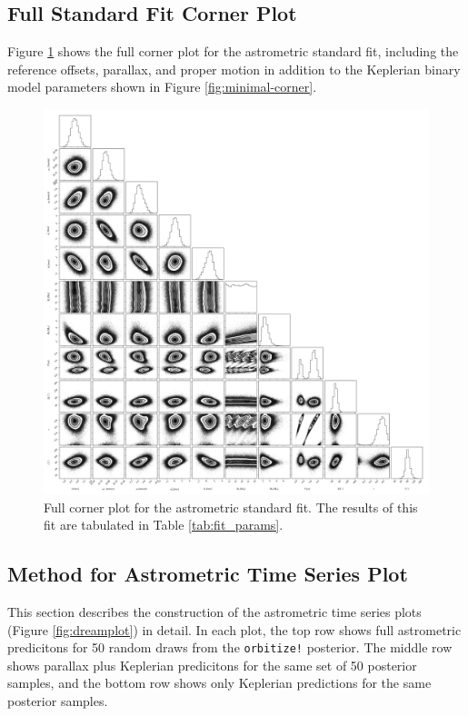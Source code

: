 \documentclass[twocolumn]{aastex631}
\begin{document}
\subsection{Full Standard Fit Corner Plot}

Figure \ref{fig:corner} shows the full corner plot for the astrometric standard fit, including the reference offsets, parallax, and proper motion in addition to the Keplerian binary model parameters shown in Figure \ref{fig:minimal-corner}. 

\begin{figure}[p]
    \centering
    \includegraphics[width=\linewidth]{figures/corner.pdf}
    \caption{Full corner plot for the astrometric standard fit. The results of this fit are tabulated in Table \ref{tab:fit_params}. }
    \label{fig:corner}
\end{figure}


\subsection{Method for Astrometric Time Series Plot}
\label{sec:dream-math}

This section describes the construction of the astrometric time series plots (Figure \ref{fig:dreamplot}) in detail. In each plot, the top row shows full astrometric predicitons for 50 random draws from the \texttt{orbitize!} posterior. The middle row shows parallax plus Keplerian predicitons for the same set of 50 posterior samples, and the bottom row shows only Keplerian predictions for the same posterior samples.
\end{document}
